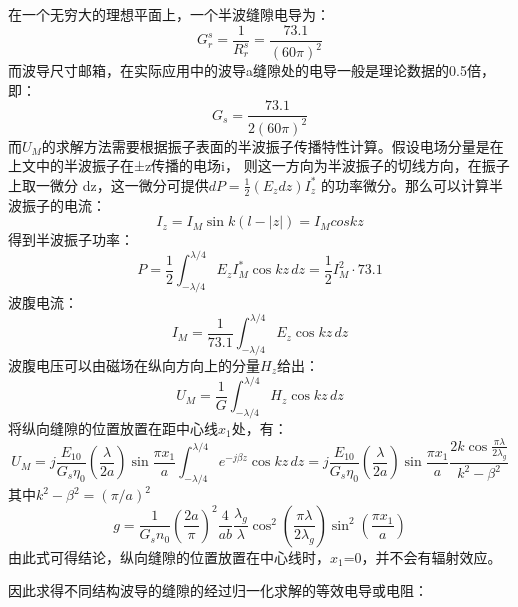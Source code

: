     在一个无穷大的理想平面上，一个半波缝隙电导为：
\begin{equation}
    G_r^s=\frac{1}{R_r^s}=\frac{73.1}{\left(60 \pi\right)^2}
\end{equation}
    而波导尺寸邮箱，在实际应用中的波导a缝隙处的电导一般是理论数据的0.5倍，即：
\begin{equation}
    G_s=\frac{73.1}{2\left(60 \pi\right)^2}
\end{equation}
    而$U_M$的求解方法需要根据振子表面的半波振子传播特性计算。假设电场分量是在上文中的半波振子在±z传播的电场i，
则这一方向为半波振子的切线方向，在振子上取一微分 dz，这一微分可提供\(dP=\frac{1}{2}\left(E_z dz\right)I_z^* \)
的功率微分。那么可以计算半波振子的电流：
\begin{equation}
    I_z=I_M\sin k\left(l-\left|z\right|\right)=I_M cos kz
\end{equation}
    得到半波振子功率：
\begin{equation}
    P=\frac{1}{2}\int_{-\lambda/4}^{\lambda/4}E_z I_M^{*}\cos kz \, dz=\frac{1}{2}I_M^{2}\cdot 73.1
\end{equation}
    波腹电流：
\begin{equation}
    I_M=\frac{1}{73.1}\int_{-\lambda/4}^{\lambda/4}E_z \cos kz \, dz
\end{equation}
    波腹电压可以由磁场在纵向方向上的分量$H_z$给出：
\begin{equation}
    U_M=\frac{1}{G}\int_{-\lambda/4}^{\lambda/4}H_z \cos kz \,dz
\end{equation}
    将纵向缝隙的位置放置在距中心线$x_1$处，有：
\begin{equation}
    U_M = j \frac{E_{10}}{G_s \eta_0} \left( \frac{\lambda}{2a} \right) \sin \frac{\pi x_1}{a} \int_{-\lambda/4}^{\lambda/4} e^{-j\beta z} \cos kz \, dz
= j \frac{E_{10}}{G_s \eta_0} \left( \frac{\lambda}{2a} \right) \sin \frac{\pi x_1}{a} \frac{2k \cos \frac{\pi \lambda}{2\lambda_g}}{k^2 - \beta^2}
\end{equation}
    其中\(k^2-\beta^2=\left(\pi/a\right)^2\)
\begin{equation}
    g = \frac{1}{G_s n_0} \left( \frac{2a}{\pi} \right)^2 \frac{4}{ab} \frac{\lambda_g}{\lambda} \cos^2\left(\frac{\pi \lambda}{2\lambda_g}\right) \sin^2\left(\frac{\pi x_1}{a}\right)
\end{equation}
    由此式可得结论，纵向缝隙的位置放置在中心线时，$x_1$=0，并不会有辐射效应。

    因此求得不同结构波导的缝隙的经过归一化求解的等效电导或电阻：

